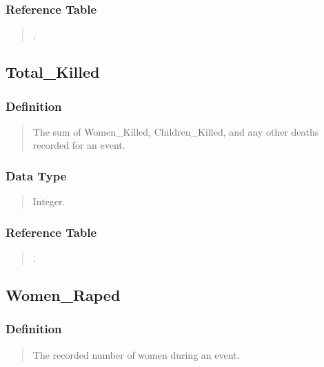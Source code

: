 \documentclass[letterpaper,10pt,english]{sphinxmanual}
\begin{document}
\subsubsection{Reference Table}
\label{\detokenize{database_schema:id51}}\begin{quote}

\sphinxAtStartPar
{\hyperref[\detokenize{database_schema:overview-table}]{}}.
\end{quote}


\subsection{Total\_Killed}
\label{\detokenize{database_schema:total-killed}}

\subsubsection{Definition}
\label{\detokenize{database_schema:id52}}\begin{quote}

\sphinxAtStartPar
The sum of Women\_Killed, Children\_Killed, and any other deaths recorded for an event.
\end{quote}


\subsubsection{Data Type}
\label{\detokenize{database_schema:id53}}\begin{quote}

\sphinxAtStartPar
Integer.
\end{quote}


\subsubsection{Reference Table}
\label{\detokenize{database_schema:id54}}\begin{quote}

\sphinxAtStartPar
{\hyperref[\detokenize{database_schema:overview-table}]{}}.
\end{quote}


\subsection{Women\_Raped}
\label{\detokenize{database_schema:women-raped}}

\subsubsection{Definition}
\label{\detokenize{database_schema:id55}}\begin{quote}

\sphinxAtStartPar
The recorded number of women during an event.
\end{quote}
\end{document}
